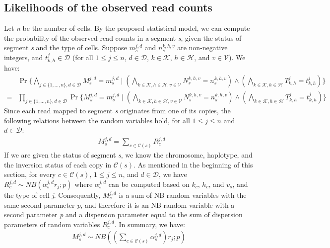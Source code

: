 \documentclass[12pt]{article}
\renewcommand{\c}{c} %
\newcommand{\C}{\mathcal{C}} %
\newcommand{\CN}{N} %
\newcommand{\cn}{n} %
\renewcommand{\i}{v} %
\newcommand{\I}{\mathcal{V}} %
\newcommand{\RC}{R} %
\newcommand{\MC}{M} %
\newcommand{\mc}{m} %
\renewcommand{\d}{d} %
\newcommand{\D}{\mathcal{D}} %
\newcommand{\chr}{k}
\newcommand{\Chr}{\mathcal{K}}
\newcommand{\h}{h} %
\renewcommand{\H}{\mathcal{H}} %
\newcommand{\T}{T} %
\renewcommand{\t}{t} %
\begin{document}
\subsection{Likelihoods of the observed read counts}
Let \textit{n} be the number of cells. By the proposed statistical model, we can compute the probability of the observed read counts in a segment \textit{s}, given the status of segment \textit{s} and the type of cells. Suppose $\mc_s^{j,\d}$ and $\cn_s^{\chr,\h,\i}$ are non-negative integers, and $\t_{\chr,\h}^j \in \D$ (for all $1 \leq j \leq n$, $\d \in \D$, $\chr \in \Chr$, $\h \in \H$, and $\i \in \I$). We have:
\begin{align}
& \Pr\{\bigwedge \limits_{j \in \{1, \ldots, n\}, \d \in \D} \MC_s^{j,\d} = \mc_s^{j,\d} \mid (\bigwedge \limits_{\chr \in \Chr, \h \in \H, \i \in \I} \CN_s^{\chr,\h,\i} = \cn_s^{\chr,\h,\i}) \wedge (\bigwedge \limits_{\chr \in \Chr, \h \in \H} \T_{\chr,\h}^j = \t_{\chr,\h}^j)\} \nonumber \\
= & \prod \limits_{j \in \{1, \ldots, n\}, \d \in \D} \Pr\{\MC_s^{j,\d} = \mc_s^{j,\d} \mid (\bigwedge \limits_{\chr \in \Chr, \h \in \H, \i \in \I} \CN_s^{\chr,\h,\i} = \cn_s^{\chr,\h,\i}) \wedge (\bigwedge \limits_{\chr \in \Chr, \h \in \H} \T_{\chr,\h}^j = \t_{\chr,\h}^j)\} \nonumber
\end{align}
Since each read mapped to segment \textit{s} originates from one of its copies, the following relations between the random variables hold, for all $1 \leq j \leq n$ and $\d \in \D$:
\begin{align}
& \MC_s^{j,\d} = \sum \limits_{\c \in \C(s)} \RC_\c^{j,\d} \nonumber
\end{align}
If we are given the status of segment \textit{s}, we know the chromosome, haplotype, and the inversion status of each copy in $\C(s)$. As mentioned in the beginning of this section, for every $\c \in \C(s)$, $1 \leq j \leq n$, and $\d \in \D$, we have $\RC_\c^{j,\d} \sim NB(\alpha_s^{j,\d}r_j;p)$ where $\alpha_s^{j,\d}$ can be computed based on $\chr_\c$, $\h_\c$, and $\i_s$, and the type of cell \textit{j}. Consequently, $\MC_s^{j,\d}$ is a sum of NB random variables with the same second parameter \textit{p}, and therefore it is an NB random variable with a second parameter \textit{p} and a dispersion parameter equal to the sum of dispersion parameters of random variables $\RC_\c^{j,\d}$. In summary, we have:
\begin{align}
\MC_s^{j,\d} \sim NB((\sum \limits_{\c \in \C(s)} \alpha_s^{j,\d}) r_j; p) \nonumber
\end{align}
\end{document}
